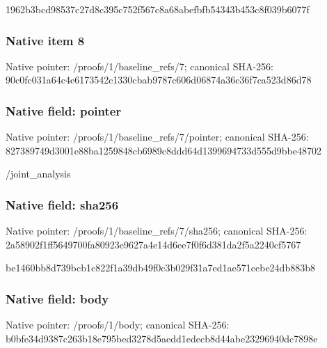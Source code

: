 \documentclass[10pt,a4paper]{article}
\begin{document}
\begingroup\raggedright\sloppy 1962b3bcd98537c27d8c395c752f567c8a68abefbfb54343b453c8f039b6077f\par\endgroup

\subsubsection{Native item 8}
Native pointer: /proofs/1/baseline\_\allowbreak{}refs/7; canonical SHA-256: 90c0fc031a64c4e6173542c1330cbab9787c606d06874a36c36f7ca523d86d78

\subsubsection{Native field: pointer}
Native pointer: /proofs/1/baseline\_\allowbreak{}refs/7/pointer; canonical SHA-256: 827389749d3001e88ba1259848cb6989c8ddd64d1399694733d555d9bbe48702

\begingroup\raggedright\sloppy /\allowbreak{}joint\_\allowbreak{}analysis\par\endgroup

\subsubsection{Native field: sha256}
Native pointer: /proofs/1/baseline\_\allowbreak{}refs/7/sha256; canonical SHA-256: 2a58902f1ff5649700fa80923e9627a4e14d6ee7f0f6d381da2f5a2240cf5767

\begingroup\raggedright\sloppy be1460bb8d739bcb1c822f1a39db49f0c3b029f31a7ed1ae571cebe24db883b8\par\endgroup

\subsubsection{Native field: body}
Native pointer: /proofs/1/body; canonical SHA-256: b0bfe34d9387c263b18e795bed3278d5aedd1edecb8d44abe23296940dc7898e
\end{document}
